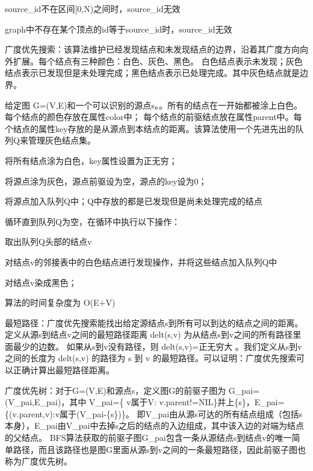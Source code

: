 \begin{DoxyItemize}
\item {\ttfamily source\+\_\+id}不在区间{\ttfamily \mbox{[}0,N)}之间时，{\ttfamily source\+\_\+id}无效
\item {\ttfamily graph}中不存在某个顶点的{\ttfamily id}等于{\ttfamily source\+\_\+id}时，{\ttfamily source\+\_\+id}无效
\end{DoxyItemize}

广度优先搜索：该算法维护已经发现结点和未发现结点的边界，沿着其广度方向向外扩展。每个结点有三种颜色：白色、灰色、黑色。 白色结点表示未发现；灰色结点表示已发现但是未处理完成；黑色结点表示已处理完成。其中灰色结点就是边界。

给定图 G=(V,E)和一个可以识别的源点{\ttfamily s}。。所有的结点在一开始都被涂上白色。每个结点的颜色存放在属性{\ttfamily color}中； 每个结点的前驱结点放在属性{\ttfamily parent}中。每个结点的属性{\ttfamily key}存放的是从源点到本结点的距离。该算法使用一个先进先出的队列\+Q来管理灰色结点集。


\begin{DoxyItemize}
\item 将所有结点涂为白色，{\ttfamily key}属性设置为正无穷；
\item 将源点涂为灰色，源点前驱设为空，源点的{\ttfamily key}设为0；
\item 将源点加入队列\+Q中；\+Q中存放的都是已发现但是尚未处理完成的结点
\item 循环直到队列\+Q为空，在循环中执行以下操作：
\begin{DoxyItemize}
\item 取出队列\+Q头部的结点{\ttfamily v}
\item 对结点{\ttfamily v}的邻接表中的白色结点进行发现操作，并将这些结点加入队列\+Q中
\item 对结点{\ttfamily v}染成黑色；
\end{DoxyItemize}
\end{DoxyItemize}

算法的时间复杂度为 O(E+\+V)

最短路径：广度优先搜索能找出给定源结点s到所有可以到达的结点之间的距离。定义从源s到结点v之间的最短路径距离 delt(s,v) 为从结点s到v之间的所有路径里面最少的边数。 如果从s到v没有路径，则 delt(s,v)=正无穷大 。我们定义从s到v之间的长度为 delt(s,v) 的路径为 s 到 v 的最短路径。可以证明：广度优先搜索可以正确计算出最短路径距离。

广度优先树：对于\+G=(V,E)和源点s，定义图\+G的前驱子图为 G\+\_\+pai=(V\+\_\+pai,E\+\_\+pai)，其中 V\+\_\+pai=\{ v属于\+V\+: v.\+parent!=N\+I\+L\}并上\{s\}，\+E\+\_\+pai=\{(v.\+parent,v)\+:v属于(V\+\_\+pai-\/\{s\})\}。 即\+V\+\_\+pai由从源s可达的所有结点组成（包括s本身），\+E\+\_\+pai由\+V\+\_\+pai中去掉s之后的结点的入边组成，其中该入边的对端为结点的父结点。 B\+F\+S算法获取的前驱子图\+G\+\_\+pai包含一条从源结点s到结点v的唯一简单路径，而且该路径也是图\+G里面从源s到v之间的一条最短路径，因此前驱子图也称为广度优先树。 

